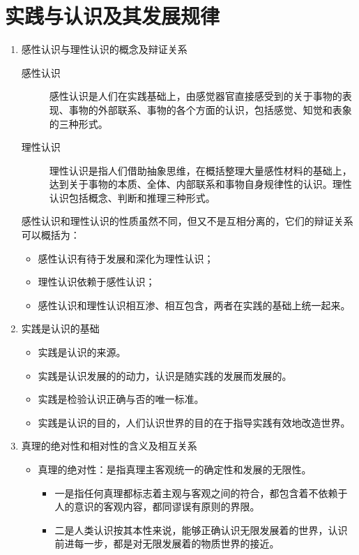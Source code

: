 \documentclass[device=pad,lang=cn,UTF8]{elegantbook}
\begin{document}
    \chapter{实践与认识及其发展规律}
    \begin{enumerate}
        \item 感性认识与理性认识的概念及辩证关系
        \begin{description}
            \item[感性认识] 感性认识是人们在实践基础上，由感觉器官直接感受到的关于事物的表现、事物的外部联系、事物的各个方面的认识，包括感觉、知觉和表象的三种形式。
            \item[理性认识] 理性认识是指人们借助抽象思维，在概括整理大量感性材料的基础上，达到关于事物的本质、全体、内部联系和事物自身规律性的认识。理性认识包括概念、判断和推理三种形式。
        \end{description}
        感性认识和理性认识的性质虽然不同，但又不是互相分离的，它们的辩证关系可以概括为：
        \begin{itemize}
            \item 感性认识有待于发展和深化为理性认识；
            \item 理性认识依赖于感性认识；
            \item 感性认识和理性认识相互渗、相互包含，两者在实践的基础上统一起来。
        \end{itemize}
        \item 实践是认识的基础
        \begin{itemize}
            \item 实践是认识的来源。
            \item 实践是认识发展的的动力，认识是随实践的发展而发展的。
            \item 实践是检验认识正确与否的唯一标准。
            \item 实践是认识的目的，人们认识世界的目的在于指导实践有效地改造世界。
        \end{itemize}
        \item 真理的绝对性和相对性的含义及相互关系
        \begin{itemize}
            \item 真理的绝对性：是指真理主客观统一的确定性和发展的无限性。
            \begin{itemize}
                \item 一是指任何真理都标志着主观与客观之间的符合，都包含着不依赖于人的意识的客观内容，都同谬误有原则的界限。
                \item 二是人类认识按其本性来说，能够正确认识无限发展着的世界，认识前进每一步，都是对无限发展着的物质世界的接近。

\end{itemize}
\end{itemize}
\end{enumerate}
\end{document}
